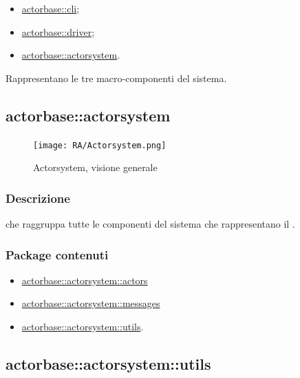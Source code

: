 \documentclass{scalatekids-article}
\begin{document}
\begin{itemize}
\item \hyperref[sec:actorbase::cli]{actorbase::cli};
\item \hyperref[sec:actorbase::driver]{actorbase::driver};
\item \hyperref[sec:actorbase::actorsystem]{actorbase::actorsystem}.
\end{itemize}

Rappresentano le tre macro-componenti del sistema.


\subsection{actorbase::actorsystem}
\label{sec:actorbase::actorsystem}

\begin{figure}[H]
  \begin{center}
    \texttt{[image: RA/Actorsystem.png]}
    \caption{Actorsystem, visione generale}
  \end{center}
\end{figure}

\subsubsection{Descrizione}

 che raggruppa tutte le componenti del sistema che
rappresentano il .

\subsubsection{Package contenuti}

\begin{itemize}
\item \hyperref[sec:actorbase::actorsystem::actors]{actorbase::actorsystem::actors}
\item \hyperref[sec:actorbase::actorsystem::messages]{actorbase::actorsystem::messages}
\item \hyperref[sec:actorbase::actorsystem::utils]{actorbase::actorsystem::utils}.
\end{itemize}

\subsection{actorbase::actorsystem::utils}
\label{sec:actorbase::actorsystem::utils}
\end{document}

